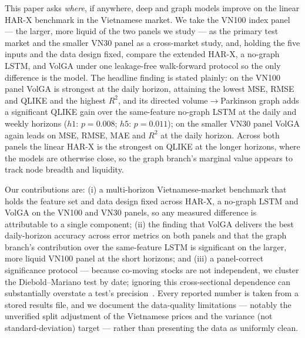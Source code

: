 \documentclass[runningheads]{llncs}
\begin{document}
This paper asks \emph{where}, if anywhere, deep and graph models improve on the linear HAR-X
benchmark in the Vietnamese market. We take the VN100 index panel --- the larger, more liquid of the
two panels we study --- as the primary test market and the smaller VN30 panel as a cross-market
study, and, holding the five inputs and the data design fixed, compare the extended HAR-X, a no-graph
LSTM, and VolGA under one leakage-free walk-forward protocol so the only difference is the model. The
headline finding is stated plainly: on the VN100 panel VolGA is strongest at the daily horizon,
attaining the lowest MSE, RMSE and QLIKE and the highest $R^2$, and its directed
volume$\to$Parkinson graph adds a significant QLIKE gain over the same-feature no-graph LSTM at the
daily and weekly horizons ($h1$: $p=0.008$; $h5$: $p=0.011$); on the smaller VN30 panel VolGA again
leads on MSE, RMSE, MAE and $R^2$ at the daily horizon. Across both panels the linear HAR-X is the
strongest on QLIKE at the longer horizons, where the models are otherwise close, so the graph branch's
marginal value appears to track node breadth and liquidity.

Our contributions are: (i) a multi-horizon Vietnamese-market benchmark that holds the feature set
and data design fixed across HAR-X, a no-graph LSTM and VolGA on the VN100 and VN30 panels, so
any measured difference is attributable to a single component; (ii) the finding that VolGA delivers
the best daily-horizon accuracy across error metrics on both panels and that the graph branch's
contribution over the same-feature LSTM is significant on the larger, more liquid VN100 panel at the
short horizons; and (iii) a panel-correct significance
protocol --- because co-moving stocks are not independent, we cluster the Diebold--Mariano test by
date; ignoring this cross-sectional dependence can substantially overstate a test's
precision~\cite{petersen2009}. Every reported number is taken from a stored results file, and we document
the data-quality limitations --- notably the unverified split adjustment of the Vietnamese prices and
the variance (not standard-deviation) target --- rather than presenting the data as uniformly clean.
\end{document}
